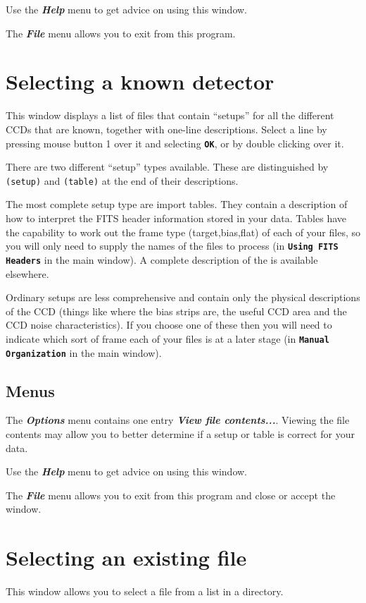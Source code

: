 \documentclass[11pt,nolof]{starlink}
\providecommand{\butt}[1]{{\bf \tt #1}}
\providecommand{\menu}[1]{{\bf \em #1}}
\providecommand{\text}[1]{{\tt #1}}
\begin{document}
Use the \menu{Help} menu to get advice on using this window.

The \menu{File} menu allows you to exit from this program.


\section{Selecting a known detector 
         \label{CCDSetDetectorWindow}}
This window displays a list of files that contain ``setups'' for
all the different CCDs that are known, together with one-line
descriptions. Select a line by pressing mouse button 1 over it
and selecting \butt{OK}, or by double clicking over it.

There are two different ``setup'' types available. These are
distinguished by \text{(setup)} and \text{(table)} at the end of their
descriptions.

The most complete setup type are import tables. They contain a
description of how to interpret the FITS header information stored in
your data. Tables have the capability to work out the frame type
(target,bias,flat) of each of your files, so you will only need to
supply the names of the files to process (in \butt{Using FITS Headers}
in the main window). A complete description of the
 is available elsewhere.

Ordinary setups are less comprehensive and contain only the physical
descriptions of the CCD (things like where the bias strips are, the
useful CCD area and the CCD noise characteristics). If you choose one
of these then you will need to indicate which sort of frame each of
your files is at a later stage (in \butt{Manual Organization} in the
main window).

\subsection{Menus }

The \menu{Options} menu contains one entry \menu{View file
contents...}. Viewing the file contents may allow you to better
determine if a setup or table is correct for your data.

Use the \menu{Help} menu to get advice on using this window.

The \menu{File} menu allows you to exit from this program and close or
accept the window.

\section{Selecting an existing file }
This window allows you to select a file from a list in a directory.
\end{document}
